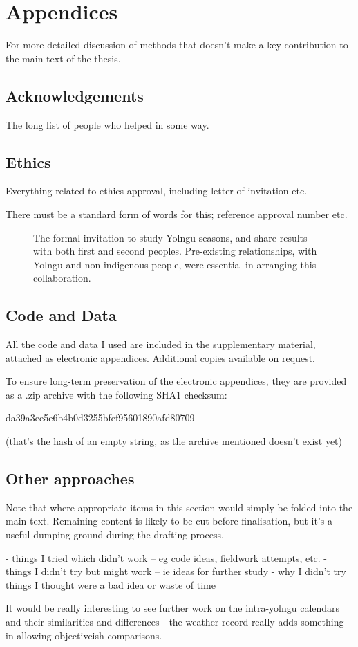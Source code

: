 \chapter{Appendices}
For more detailed discussion of methods that doesn't make a key contribution to the main text of the thesis.

\section{Acknowledgements}
The long list of people who helped in some way.


\section{Ethics} \label{sec:ethics}
Everything related to ethics approval, including letter of invitation etc.

There must be a standard form of words for this; reference approval number etc.

\begin{figure}[p]
    \centering
    \caption[Letter of invitation for collaborative research]{
        The formal invitation to study Yolngu seasons,
        and share results with both first and second peoples.
        Pre-existing relationships, with Yolngu and non-indigenous people,
        were essential in arranging this collaboration.
        }
    \label{app:invitation-letter}
\end{figure}


\section{Code and Data} \label{sec:appendix-code}
All the code and data I used are included in the supplementary material,
attached as electronic appendices.  Additional copies available on request.

To ensure long-term preservation of the electronic appendices, they
are provided as a .zip archive with the following SHA1 checksum:

da39a3ee5e6b4b0d3255bfef95601890afd80709

(that's the hash of an empty string, as the archive mentioned doesn't exist yet)



\section{Other approaches}
Note that where appropriate items in this section would simply be folded into the main text.
Remaining content is likely to be cut before finalisation,
but it's a useful dumping ground during the drafting process.

-	things I tried which didn't work – eg code ideas, fieldwork attempts, etc.
-	things I didn't try but might work – ie ideas for further study
-	why I didn't try things I thought were a bad idea or waste of time

It would be really interesting to see further work on the intra-yolngu calendars and their similarities and differences - the weather record really adds something in allowing objectiveish comparisons.


